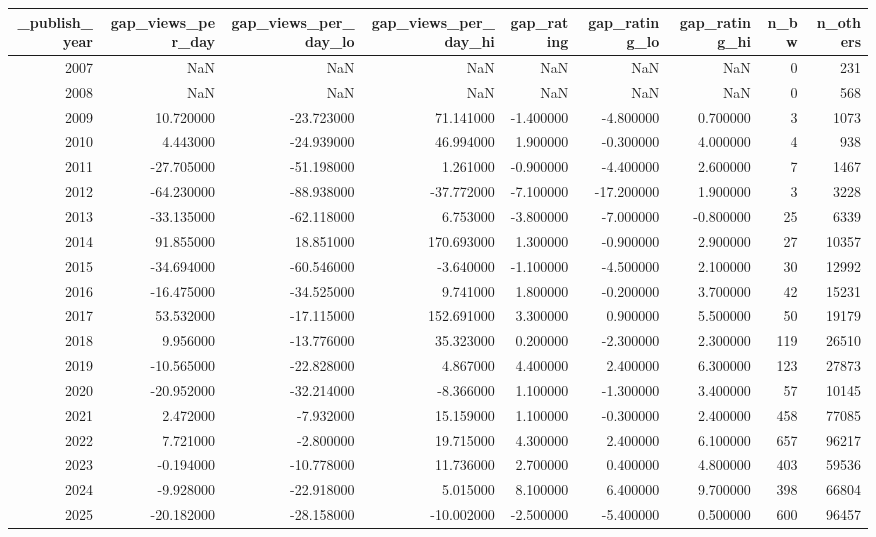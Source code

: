 \begin{tabular}{rrrrrrrrr}
\toprule
_publish_year & gap_views_per_day & gap_views_per_day_lo & gap_views_per_day_hi & gap_rating & gap_rating_lo & gap_rating_hi & n_bw & n_others \\
\midrule
2007 & NaN & NaN & NaN & NaN & NaN & NaN & 0 & 231 \\
2008 & NaN & NaN & NaN & NaN & NaN & NaN & 0 & 568 \\
2009 & 10.720000 & -23.723000 & 71.141000 & -1.400000 & -4.800000 & 0.700000 & 3 & 1073 \\
2010 & 4.443000 & -24.939000 & 46.994000 & 1.900000 & -0.300000 & 4.000000 & 4 & 938 \\
2011 & -27.705000 & -51.198000 & 1.261000 & -0.900000 & -4.400000 & 2.600000 & 7 & 1467 \\
2012 & -64.230000 & -88.938000 & -37.772000 & -7.100000 & -17.200000 & 1.900000 & 3 & 3228 \\
2013 & -33.135000 & -62.118000 & 6.753000 & -3.800000 & -7.000000 & -0.800000 & 25 & 6339 \\
2014 & 91.855000 & 18.851000 & 170.693000 & 1.300000 & -0.900000 & 2.900000 & 27 & 10357 \\
2015 & -34.694000 & -60.546000 & -3.640000 & -1.100000 & -4.500000 & 2.100000 & 30 & 12992 \\
2016 & -16.475000 & -34.525000 & 9.741000 & 1.800000 & -0.200000 & 3.700000 & 42 & 15231 \\
2017 & 53.532000 & -17.115000 & 152.691000 & 3.300000 & 0.900000 & 5.500000 & 50 & 19179 \\
2018 & 9.956000 & -13.776000 & 35.323000 & 0.200000 & -2.300000 & 2.300000 & 119 & 26510 \\
2019 & -10.565000 & -22.828000 & 4.867000 & 4.400000 & 2.400000 & 6.300000 & 123 & 27873 \\
2020 & -20.952000 & -32.214000 & -8.366000 & 1.100000 & -1.300000 & 3.400000 & 57 & 10145 \\
2021 & 2.472000 & -7.932000 & 15.159000 & 1.100000 & -0.300000 & 2.400000 & 458 & 77085 \\
2022 & 7.721000 & -2.800000 & 19.715000 & 4.300000 & 2.400000 & 6.100000 & 657 & 96217 \\
2023 & -0.194000 & -10.778000 & 11.736000 & 2.700000 & 0.400000 & 4.800000 & 403 & 59536 \\
2024 & -9.928000 & -22.918000 & 5.015000 & 8.100000 & 6.400000 & 9.700000 & 398 & 66804 \\
2025 & -20.182000 & -28.158000 & -10.002000 & -2.500000 & -5.400000 & 0.500000 & 600 & 96457 \\
\bottomrule
\end{tabular}
